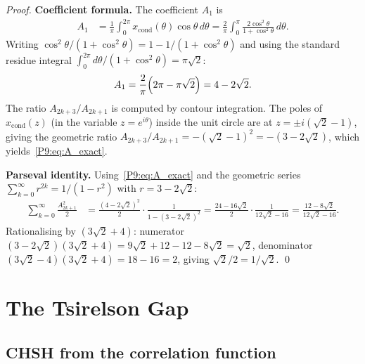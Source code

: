 \documentclass[11pt,a4paper]{article}
\theoremstyle{definition}
\theoremstyle{remark}
\newcommand{\xcond}{x_{\mathrm{cond}}}
\begin{document}
\begin{proof}
\textbf{Coefficient formula.}
The coefficient $A_1$ is
\begin{align*}
  A_1 &= \frac{1}{\pi}\int_0^{2\pi}\xcond(\theta)\cos\theta\,d\theta
  = \frac{2}{\pi}\int_0^{\pi}\frac{2\cos^2\theta}{1+\cos^2\theta}\,d\theta.
\end{align*}
Writing $\cos^2\theta/(1+\cos^2\theta) = 1-1/(1+\cos^2\theta)$ and using the
standard residue integral $\int_0^{2\pi}d\theta/(1+\cos^2\theta) = \pi\sqrt{2}$:
\begin{equation*}
  A_1 = \frac{2}{\pi}\Bigl(2\pi - \pi\sqrt{2}\Bigr) = 4-2\sqrt{2}.
\end{equation*}
The ratio $A_{2k+3}/A_{2k+1}$ is computed by contour integration.
The poles of $\xcond(z)$ (in the variable $z=e^{i\theta}$) inside
the unit circle are at $z=\pm i(\sqrt{2}-1)$, giving the geometric
ratio $A_{2k+3}/A_{2k+1} = -(\sqrt{2}-1)^2 = -(3-2\sqrt{2})$,
which yields~\eqref{P9:eq:A_exact}.
 
\textbf{Parseval identity.}
Using~\eqref{P9:eq:A_exact} and the geometric series
$\sum_{k=0}^\infty r^{2k}=1/(1-r^2)$ with $r=3-2\sqrt{2}$:
\begin{align*}
  \sum_{k=0}^\infty \frac{A_{2k+1}^2}{2}
  &= \frac{(4-2\sqrt{2})^2}{2}\cdot\frac{1}{1-(3-2\sqrt{2})^2}
  = \frac{24-16\sqrt{2}}{2}\cdot\frac{1}{12\sqrt{2}-16}
  = \frac{12-8\sqrt{2}}{12\sqrt{2}-16}.
\end{align*}
Rationalising by $(3\sqrt{2}+4)$:
numerator $(3-2\sqrt{2})(3\sqrt{2}+4) = 9\sqrt{2}+12-12-8\sqrt{2} = \sqrt{2}$,
denominator $(3\sqrt{2}-4)(3\sqrt{2}+4) = 18-16 = 2$, giving $\sqrt{2}/2 = 1/\sqrt{2}$.
\qed
\end{proof}
 
\section{The Tsirelson Gap}
\label{P9:sec:gap}
\label{P9:sec:tsirelson}
 
\subsection{CHSH from the correlation function}
 
\end{document}
